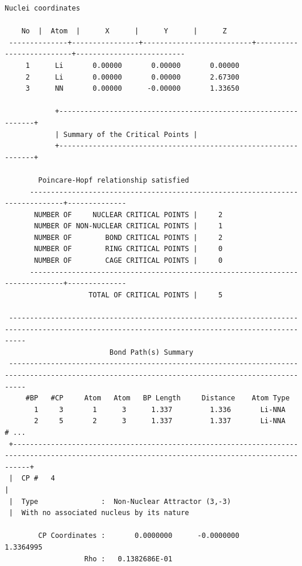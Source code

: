 \begin{lstlisting}[language=plain]
                     Nuclei coordinates 

    No  |  Atom  |      X      |      Y      |      Z    
 --------------+----------------+--------------------------+--------------------------+--------------------------
     1      Li       0.00000       0.00000       0.00000
     2      Li       0.00000       0.00000       2.67300
     3      NN       0.00000      -0.00000       1.33650

            +----------------------------------------------------------------+
            | Summary of the Critical Points |
            +----------------------------------------------------------------+

        Poincare-Hopf relationship satisfied
      ------------------------------------------------------------------------------+--------------
       NUMBER OF     NUCLEAR CRITICAL POINTS |     2    
       NUMBER OF NON-NUCLEAR CRITICAL POINTS |     1    
       NUMBER OF        BOND CRITICAL POINTS |     2    
       NUMBER OF        RING CRITICAL POINTS |     0    
       NUMBER OF        CAGE CRITICAL POINTS |     0    
      ------------------------------------------------------------------------------+--------------
                    TOTAL OF CRITICAL POINTS |     5    

 ------------------------------------------------------------------------------------------------------------------------------------------------
                         Bond Path(s) Summary
 ------------------------------------------------------------------------------------------------------------------------------------------------
     #BP   #CP     Atom   Atom   BP Length     Distance    Atom Type 
       1     3       1      3      1.337         1.336       Li-NNA
       2     5       2      3      1.337         1.337       Li-NNA
# ...
 +------------------------------------------------------------------------------------------------------------------------------------------------+
 |  CP #   4                                                              |
 |  Type               :  Non-Nuclear Attractor (3,-3)
 |  With no associated nucleus by its nature
 
        CP Coordinates :       0.0000000      -0.0000000       1.3364995
                   Rho :   0.1382686E-01
\end{lstlisting}

